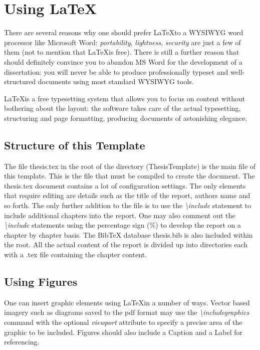 \chapter{Using \LaTeX}\label{ch:usingLatex}

There are several reasons why one should prefer \LaTeX \space to a WYSIWYG word processor like Microsoft Word: \textsl{portability}, \textsl{lightness}, \textsl{security} are just a few of them (not to mention that \LaTeX \space is free). There is still a further reason that should definitely convince you to abandon MS Word for the development of a dissertation: you will never be able to produce professionally typeset and well-structured documents using most standard WYSIWYG tools.

\LaTeX \space is a free typesetting system that allows you to focus on content without bothering about the layout: the software takes care of the actual typesetting, structuring and page formatting, producing documents of astonishing elegance.

\section{Structure of this Template}

The file thesis.tex in the root of the directory (ThesisTemplate) is the main file of this template. This is the file that must be compiled to create the document. The thesis.tex document contains a lot of configuration settings. The only elements that require editing are details such as the title of the report, authors name and so forth. The only further addition to the file is to use the \emph{\textbackslash include} statement to include additional chapters into the report. One may also comment out the \emph{\textbackslash include} statements using the percentage sign (\%) to develop the report on a chapter by chapter basis. The BibTeX database thesis.bib is also included within the root. All the actual content of the report is divided up into directories each with a .tex file containing the chapter content.

\section{Using Figures}

 One can insert graphic elements using \LaTeX \space in a number of ways. Vector based imagery such as diagrams saved to the pdf format may use the \emph{\textbackslash includegraphics} command with the optional \emph{viewport} attribute to specify a precise area of the graphic to be included. Figures should also include a Caption and a Label for referencing.

